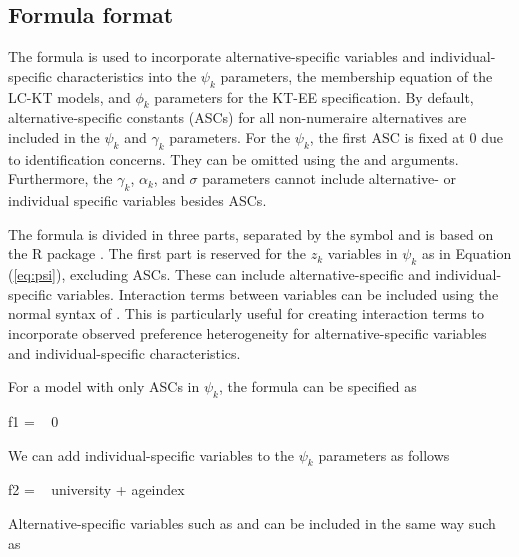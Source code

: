 \hypertarget{formula}{%
\subsection{Formula format}\label{formula}}

The formula is used to incorporate alternative-specific variables and
individual-specific characteristics into the \(\psi_k\) parameters, the
membership equation of the LC-KT models, and \(\phi_k\) parameters for
the KT-EE specification. By default, alternative-specific constants
(ASCs) for all non-numeraire alternatives are included in the \(\psi_k\)
and \(\gamma_k\) parameters. For the \(\psi_k\), the first ASC is fixed
at 0 due to identification concerns. They can be omitted using the
 and  arguments. Furthermore,
the \(\gamma_k\), \(\alpha_k\), and \(\sigma\) parameters cannot include
alternative- or individual specific variables besides ASCs.

The formula is divided in three parts, separated by the symbol \code{|}
and is based on the R package  \citep{zeileisextended2010}.
The first part is reserved for the \(z_k\) variables in \(\psi_k\) as in
Equation (\ref{eq:psi}), excluding ASCs. These can include
alternative-specific and individual-specific variables. Interaction
terms between variables can be included using the normal 
syntax of . This is particularly useful for creating
interaction terms to incorporate observed preference heterogeneity for
alternative-specific variables and individual-specific characteristics.

For a model with only ASCs in \(\psi_k\), the formula can be specified
as

\begin{Schunk}
\begin{Sinput}
f1 = ~ 0
\end{Sinput}
\end{Schunk}

We can add individual-specific variables to the \(\psi_k\) parameters as
follows

\begin{Schunk}
\begin{Sinput}
f2 = ~ university + ageindex
\end{Sinput}
\end{Schunk}

Alternative-specific variables such as  and  can be
included in the same way such as


